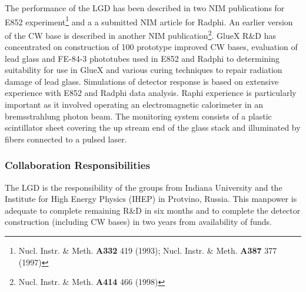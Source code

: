 The performance of the LGD has been described in two NIM publications for E852 
experiment\footnote{Nucl. Instr. \& Meth. \textbf{A332} 419 (1993); 
 Nucl. Instr. \& Meth. \textbf{A387} 377 (1997)} 
and a a submitted NIM article for Radphi. An earlier version of the CW base is described
in another NIM
publication\footnote{Nucl. Instr. \& Meth. \textbf{A414} 466 (1998)}.  GlueX R\&D has concentrated on
construction of 100 prototype improved CW bases, evaluation of  lead glass and FE-84-3
phototubes used in E852 and Radphi to
determining suitability for use in GlueX and various curing techniques to repair radiation damage of
lead glass.  Simulations of detector response is based on extensive
experience with E852 and Radphi data analysis.  Raphi experience is particularly important
as it involved operating an electromagnetic calorimeter in an bremsstrahlung
photon beam.
The monitoring system consists of a plastic scintillator sheet covering the 
up stream end of the glass stack
and illuminated by fibers connected to a pulsed laser.  



\subsubsection*{Collaboration Responsibilities}

The LGD is the responsibility of the groups from Indiana University and the Institute for
High Energy Physics (IHEP) in Protvino, Russia.  This manpower is adequate to complete
remaining R\&D in six months and to complete the detector construction (including CW bases) in
two years from availability of funds.

